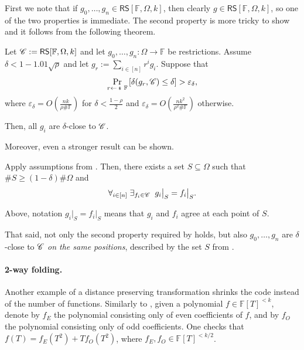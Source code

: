\documentclass[../../book]{subfiles}
\begin{document}
First we note that if $g_0,\dots,g_n \in \mathsf{RS}[\mathbb{F},\Omega,k]$, then clearly $g \in \mathsf{RS}[\mathbb{F},\Omega,k]$, so one of the two properties is immediate.
The second property is more tricky to show and it follows from the following theorem.

\begin{lemma}\label{lemma:proximity-gap-simplified}
    Let $\mathscr{C} := \mathsf{RS}[\mathbb{F},\Omega,k]$ and let $g_0,\dots,g_n: \Omega \to \mathbb{F}$ be restrictions. 
    Assume $\delta < 1-1.01\sqrt{\rho}$ and let $g_r := \sum_{i \in [n]}r^ig_i$.
    Suppose that
    \begin{equation*}
        \Pr_{r \leftarrowS \mathbb{F}}\left[\delta(g_r, \code) \leq \delta\right] > \varepsilon_{\delta},
    \end{equation*}
    where $\varepsilon_{\delta} = O(\frac{nk}{\rho\#\mathbb{F}})$ for $\delta<\frac{1-\rho}{2}$ and $\varepsilon_{\delta} = O(\frac{nk^2}{\rho^2\#\mathbb{F}})$ otherwise. 
    
    Then, all $g_i$ are $\delta$-close to $\mathscr{C}$.
\end{lemma}

Moreover, even a stronger result can be shown.
\begin{theorem}\label{thm:proximity-gap}
    Apply assumptions from .
    Then, there exists a set $S \subseteq \Omega$ such that $\#S \geq (1-\delta)\#\Omega$ and
    \begin{equation*}
        \forall_{i \in [n]} \; \exists_{f_i \in \mathscr{C}} \;\; g_i\big|_S = f_i\big|_S.
    \end{equation*}
\end{theorem}

Above, notation $g_i\big|_S = f_i\big|_S$ means that $g_i$ and $f_i$ agree at each point of $S$.

That said, not only the second property required by  holds, but also $g_0,\dots,g_n$ are $\delta$-close to $\mathscr{C}$ \emph{on the same positions}, described by the set $S$ from .

\paragraph{2-way folding.}
Another example of a distance preserving transformation shrinks the code instead of the number of functions.
Similarly to , given a polynomial $f \in \mathbb{F}[T]^{<k}$, denote by $f_E$ the polynomial consisting only of even coefficients of $f$, and by $f_O$ the polynomial consisting only of odd coefficients.
One checks that $f(T) = f_E(T^2) + T f_O(T^2)$, where $f_E, f_O \in \mathbb{F}[T]^{<k/2}$.
\end{document}
